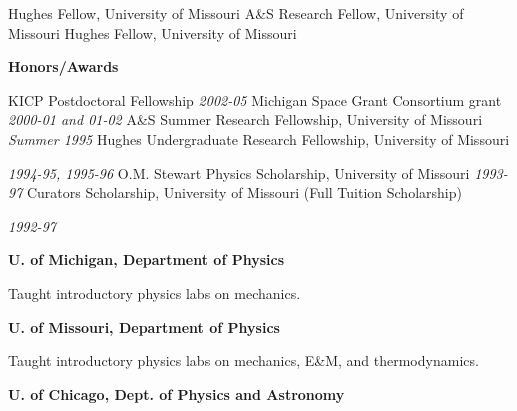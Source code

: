 \documentclass[12pt]{article}
\begin{document}
	\hfill
\newline
\makebox[1.25in][l]{}
	{Hughes Fellow, University of Missouri}
	\hfill
\newline
\makebox[1.25in][l]{}
	{A\&S Research Fellow, University of Missouri}
	\hfill
\newline
\makebox[1.25in][l]{}
	{Hughes Fellow, University of Missouri}
	\hfill

\ssp
\ssp
\noindent
\parbox[l]{1.25in}{{\bf Honors/Awards}}
\parbox[t]{5.40in}{
KICP Postdoctoral Fellowship \hfill {\small \it 2002-05} \newline
Michigan Space Grant Consortium grant  \hfill 
       {\small \it 2000-01 and 01-02 }\newline
A\&S Summer Research Fellowship, University of Missouri \hfill 
       {\small \it Summer 1995}\newline
Hughes Undergraduate Research Fellowship, University of
       Missouri  
	   
	   \hfill {\small \it 1994-95, 1995-96}\newline
O.M. Stewart Physics Scholarship, University
       of Missouri \hfill {\small \it 1993-97}\newline
Curators Scholarship, University of Missouri 
       (Full Tuition Scholarship) 
	   
	   \hfill {\small \it 1992-97}
}

\newpage
\ssp
\ssp
\noindent
{}
{{\bf U. of Michigan, Department of Physics}}
\hfill
{}

\noindent
\makebox[1.25in][l]{}
\parbox[t]{5.40in}{Taught introductory physics labs on mechanics.}

\ssp
\noindent
\makebox[1.25in][l]{}
{{\bf U. of Missouri, Department of Physics}}
\hfill
{}

\noindent
\makebox[1.25in][l]{}
\parbox[t]{5.40in}{Taught introductory physics labs on mechanics, E\&M, and thermodynamics.}

\ssp
\noindent
\makebox[1.25in][l]{}
{{\bf U. of Chicago, Dept. of Physics and Astronomy}}
\end{document}
